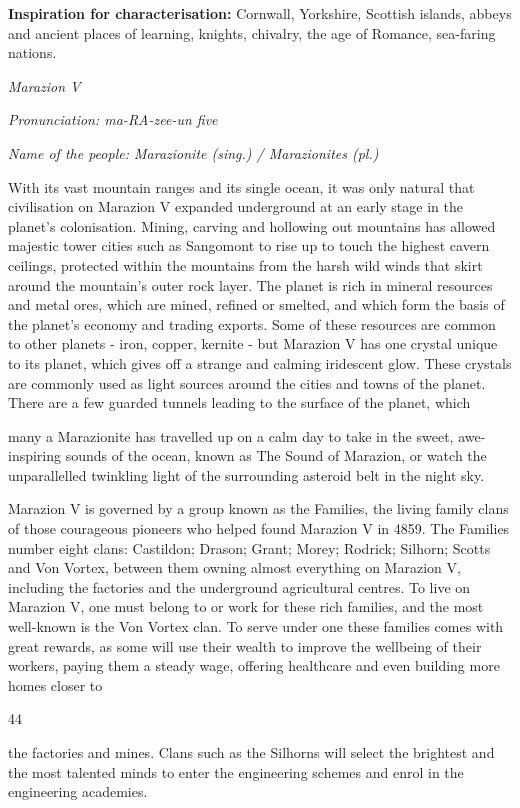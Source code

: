\documentclass{scrbook}
\begin{document}
\textbf{Inspiration for characterisation:} Cornwall, Yorkshire, Scottish islands, abbeys and ancient places of learning, knights, chivalry, the age of Romance, sea-faring nations.

\textit{Marazion V}

\textit{Pronunciation: ma-RA-zee-un five}

\textit{Name of the people: Marazionite (sing.) / Marazionites (pl.)}

With its vast mountain ranges and its single ocean, it was only natural that civilisation on Marazion V expanded underground at an early stage in the planet's colonisation. Mining, carving and hollowing out mountains has allowed majestic tower cities such as Sangomont to rise up to touch the highest cavern ceilings, protected within the mountains from the harsh wild winds that skirt around the mountain's outer rock layer. The planet is rich in mineral resources and metal ores, which are mined, refined or smelted, and which form the basis of the planet's economy and trading exports. Some of these resources are common to other planets - iron, copper, kernite - but Marazion V has one crystal unique to its planet, which gives off a strange and calming iridescent glow. These crystals are commonly used as light sources around the cities and towns of the planet. There are a few guarded tunnels leading to the surface of the planet, which

many a Marazionite has travelled up on a calm day to take in the sweet, awe-inspiring sounds of the ocean, known as The Sound of Marazion, or watch the unparallelled twinkling light of the surrounding asteroid belt in the night sky.

Marazion V is governed by a group known as the Families, the living family clans of those courageous pioneers who helped found Marazion V in 4859. The Families number eight clans: Castildon; Drason; Grant; Morey; Rodrick; Silhorn; Scotts and Von Vortex, between them owning almost everything on Marazion V, including the factories and the underground agricultural centres. To live on Marazion V, one must belong to or work for these rich families, and the most well-known is the Von Vortex clan. To serve under one these families comes with great rewards, as some will use their wealth to improve the wellbeing of their workers, paying them a steady wage, offering healthcare and even building more homes closer to

44

the factories and mines. Clans such as the Silhorns will select the brightest and the most talented minds to enter the engineering schemes and enrol in the engineering academies.
\end{document}
